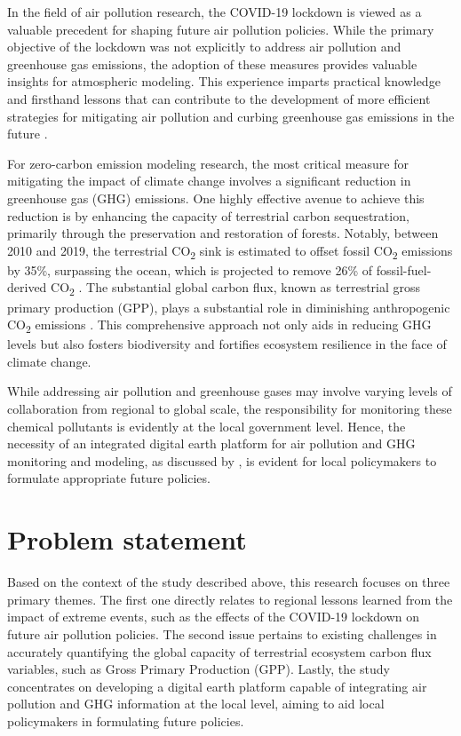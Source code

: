 In the field of air pollution research, the COVID-19 lockdown is viewed as a valuable precedent for shaping future air pollution policies. While the primary objective of the lockdown was not explicitly to address air pollution and greenhouse gas emissions, the adoption of these measures provides valuable insights for atmospheric modeling. This experience imparts practical knowledge and firsthand lessons that can contribute to the development of more efficient strategies for mitigating air pollution and curbing greenhouse gas emissions in the future \citep{grange2021covid}. \par

For zero-carbon emission modeling research, the most critical measure for mitigating the impact of climate change involves a significant reduction in greenhouse gas (GHG) emissions. One highly effective avenue to achieve this reduction is by enhancing the capacity of terrestrial carbon sequestration, primarily through the preservation and restoration of forests. Notably, between 2010 and 2019, the terrestrial CO\textsubscript{2} sink is estimated to offset fossil CO\textsubscript{2} emissions by 35\%, surpassing the ocean, which is projected to remove 26\% of fossil-fuel-derived CO\textsubscript{2} \citep{friedlingstein2020global, wang2022disentangling}. The substantial global carbon flux, known as terrestrial gross primary production (GPP), plays a substantial role in diminishing anthropogenic CO\textsubscript{2} emissions \citep{beer2010terrestrial}. This comprehensive approach not only aids in reducing GHG levels but also fosters biodiversity and fortifies ecosystem resilience in the face of climate change. \par

While addressing air pollution and greenhouse gases may involve varying levels of collaboration from regional to global scale, the responsibility for monitoring these chemical pollutants is evidently at the local government level. Hence, the necessity of an integrated digital earth platform for air pollution and GHG monitoring and modeling, as discussed by \citep{fukui2021digital}, is evident for local policymakers to formulate appropriate future policies. \par

\section{Problem statement}
Based on the context of the study described above, this research focuses on three primary themes. The first one directly relates to regional lessons learned from the impact of extreme events, such as the effects of the COVID-19 lockdown on future air pollution policies. The second issue pertains to existing challenges in accurately quantifying the global capacity of terrestrial ecosystem carbon flux variables, such as Gross Primary Production (GPP). Lastly, the study concentrates on developing a digital earth platform capable of integrating air pollution and GHG information at the local level, aiming to aid local policymakers in formulating future policies. \par

